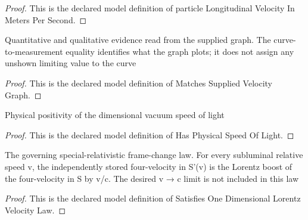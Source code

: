 \begin{proof}
  This is the declared model definition of particle Longitudinal Velocity In Meters Per Second.
\end{proof}
\begin{definition}
  \label{def:physics:phyx-mini-0597:phyxminiproblems-problemphyxmini0597-matchessuppliedvelocitygraph}
  Quantitative and qualitative evidence read from the supplied graph. The curve-to-measurement equality identifies what the graph plots; it does not assign any unshown limiting value to the curve
\end{definition}
\begin{proof}
  This is the declared model definition of Matches Supplied Velocity Graph.
\end{proof}
\begin{definition}
  \label{def:physics:phyx-mini-0597:phyxminiproblems-problemphyxmini0597-hasphysicalspeedoflight}
  Physical positivity of the dimensional vacuum speed of light
\end{definition}
\begin{proof}
  This is the declared model definition of Has Physical Speed Of Light.
\end{proof}
\begin{definition}
  \label{def:physics:phyx-mini-0597:phyxminiproblems-problemphyxmini0597-satisfiesonedimensionallorentzvelocitylaw}
  The governing special-relativistic frame-change law. For every subluminal relative speed v, the independently stored four-velocity in S'(v) is the Lorentz boost of the four-velocity in S by v/c. The desired v → c limit is not included in this law
\end{definition}
\begin{proof}
  This is the declared model definition of Satisfies One Dimensional Lorentz Velocity Law.
\end{proof}

